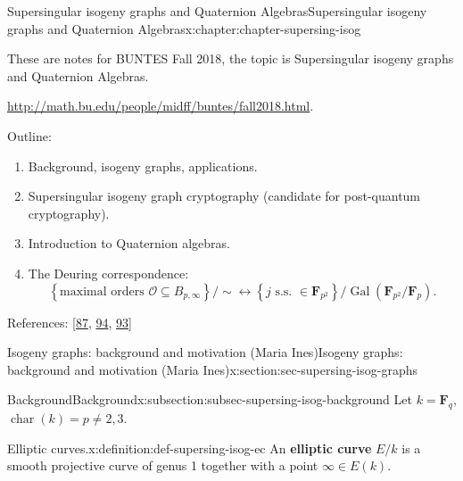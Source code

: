 \documentclass[oneside,10pt,]{book}
\newcommand{\terminology}[1]{\textbf{#1}}
\numberwithin{equation}{section}
\newcommand{\FF}{\mathbf{F}}
\newcommand{\ints}{\mathcal{O}}
\DeclareMathOperator{\characteristic}{char}
\newcommand{\Gal}[2]{\operatorname{Gal}(#1/#2)}
\begin{document}
\begin{chapterptx}{Supersingular isogeny graphs and Quaternion Algebras}{}{Supersingular isogeny graphs and Quaternion Algebras}{}{}{x:chapter:chapter-supersing-isog}
\begin{introduction}{}%
These are notes for BUNTES Fall 2018, the topic is Supersingular isogeny graphs and Quaternion Algebras.%
\par
\url{http://math.bu.edu/people/midff/buntes/fall2018.html}.%
\par
Outline:%
\begin{enumerate}
\item{}Background, isogeny graphs, applications.%
\item{}Supersingular isogeny graph cryptography (candidate for post-quantum cryptography).%
\item{}Introduction to Quaternion algebras.%
\item{}The Deuring correspondence:%
\begin{equation*}
\left\{ \text{maximal orders }\ints \subseteq B_{p,\infty}\right\}/\sim \leftrightarrow \left\{ j \text{ s.s. }\in \FF_{p^2}\right\}/\Gal{\FF_{p^2}}{\FF_p}\text{.}
\end{equation*}
%
\end{enumerate}
%
\par
References: [\hyperlink{x:biblio:bib-sutherland}{87}, \hyperlink{x:biblio:bib-voight-quat}{94}, \hyperlink{x:biblio:bib-velu}{93}]%
\end{introduction}%
%
%
\typeout{************************************************}
\typeout{************************************************}
%
\begin{sectionptx}{Isogeny graphs: background and motivation (Maria Ines)}{}{Isogeny graphs: background and motivation (Maria Ines)}{}{}{x:section:sec-supersing-isog-graphs}
%
%
\typeout{************************************************}
\typeout{************************************************}
%
\begin{subsectionptx}{Background}{}{Background}{}{}{x:subsection:subsec-supersing-isog-background}
Let \(k = \FF_q\), \(\characteristic (k) = p \ne 2,3\).%
\begin{definition}{Elliptic curves.}{x:definition:def-supersing-isog-ec}%
An \terminology{elliptic curve} \(E/k\) is a smooth projective curve of genus 1 together with a point \(\infty \in E(k)\).%
\end{definition}

\end{subsectionptx}
\end{sectionptx}
\end{chapterptx}
\end{document}
